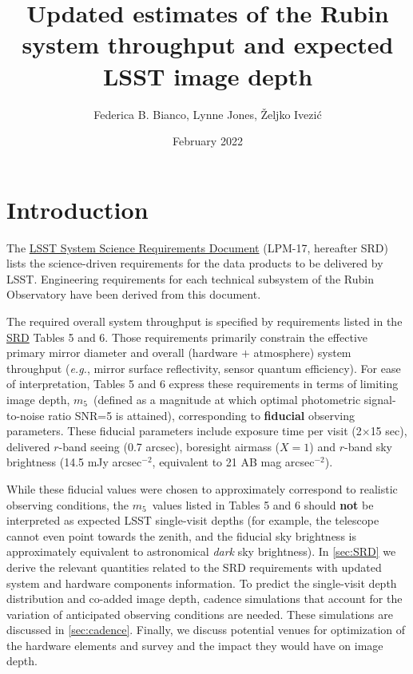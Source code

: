 \documentclass[PST,authoryear,toc]{lsstdoc}
\title{Updated estimates of the Rubin system throughput and expected LSST image depth}
\author{Federica B. Bianco, Lynne Jones, \v{Z}eljko Ivezi\'{c}}
\date{February 2022}
\date{\vcsDate}
\newcommand{\mf}{\ensuremath{m_5}}
\begin{document}
\maketitle


\section{Introduction}

The \href{https://docushare.lsst.org/docushare/dsweb/Get/LPM-17}{{LSST System Science Requirements Document}} (LPM-17, hereafter SRD) lists the science-driven requirements for the data products to be delivered by LSST. 
Engineering requirements for each technical subsystem of the Rubin Observatory have been derived from this document. 

The required overall system throughput is specified by requirements listed in the \href{https://docushare.lsst.org/docushare/dsweb/Get/LPM-17}{{SRD}} Tables 5 and 6. 
Those requirements primarily constrain the effective primary mirror diameter and overall (hardware $+$ atmosphere) 
system throughput ({\it e.g.}, mirror surface reflectivity, sensor quantum efficiency). For ease of interpretation, 
Tables 5 and 6 express these requirements in terms of limiting image depth, \mf\ (defined as a magnitude at which 
optimal photometric signal-to-noise ratio SNR=5 is attained), corresponding to {\bf fiducial} observing parameters. These fiducial parameters 
include exposure time per visit (2$\times$15 sec), delivered $r$-band seeing (0.7 arcsec), boresight airmass ($X=1$) and $r$-band sky brightness (14.5 mJy arcsec$^{-2}$, equivalent to 
21 AB mag arcsec$^{-2}$). 

While these fiducial values were chosen to approximately correspond to realistic observing conditions, the \mf\ values listed in Tables 5 and 6 should {\bf not} be interpreted as expected LSST single-visit depths (for example, 
the telescope cannot even point towards the zenith, and the fiducial sky brightness is approximately equivalent to 
astronomical {\it dark} sky brightness). In \autoref{sec:SRD} we derive the relevant quantities related to the SRD requirements with updated system and hardware components information. To predict the single-visit depth distribution and co-added image depth, 
cadence simulations that account for the variation of anticipated observing conditions are needed. These simulations are discussed 
in \autoref{sec:cadence}. Finally, we discuss potential venues for optimization of the hardware elements and survey and the impact they would have on image depth.
\end{document}
